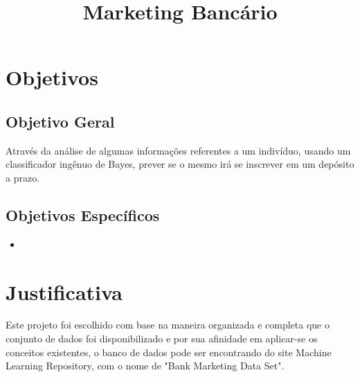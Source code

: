 \documentclass[conference]{IEEEtran}
\begin{document}
\title{Marketing Bancário}

\author{
\and
{}
\and
{}

}

\maketitle





\section{Objetivos}
\subsection{Objetivo Geral}
Através da análise de algumas informações referentes a um indivíduo, usando um classificador ingênuo de Bayes, prever se o mesmo irá se inscrever em um depósito a prazo. 
\subsection{Objetivos Específicos}
\begin{itemize}
\item 
\end{itemize}
\section{Justificativa}
Este projeto foi escolhido com base na maneira organizada e completa que o conjunto de dados  foi disponibilizado e por sua afinidade em aplicar-se os conceitos existentes, o banco de dados pode ser encontrando do site Machine Learning Repository, com o nome de "Bank Marketing Data Set"\cite{b1}.
\end{document}
